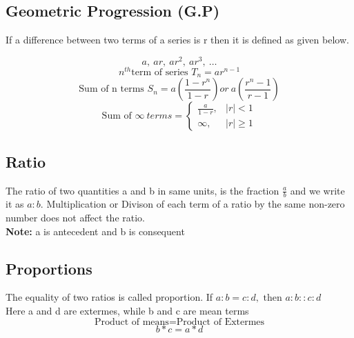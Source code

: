 \subsection{Geometric Progression (G.P)}
If a difference between two terms of a series is r then it is defined as given below.
\begin{fleqn}
\[a,\ ar,\ ar^2,\ ar^3,\ \ldots \]
\[n^{th} \text{term of series } T_n = ar^{n-1}\]
\[\text{Sum of n terms } S_n = a\left( \frac{1 - r^n}{1-r} \right) or\ a \left( \frac{r^n-1}{r-1} \right)\]
\[
\text{Sum of } \infty \ terms =
\begin{cases}
    \frac{a}{1-r}, &|r| < 1\\
    \infty, &|r| \geq 1 
\end{cases}
\]
\end{fleqn}


\subsection{Ratio}
The ratio of two quantities a and b in same units, is the fraction \(\frac{a}{b}\) and we write it as \(a:b\). Multiplication or Divison of each term of a ratio by the same non-zero number does not affect the ratio.\\ 
\textbf{Note:} a is antecedent and b is consequent


\subsection{Proportions}
The equality of two ratios is called proportion.
If \(a:b=c:d,\text{ then } a:b::c:d\) \\
Here a and d are extermes, while b and c are mean terms
\[\text{Product of means} = \text{Product of Extermes} \]
\[b*c=a*d\]


